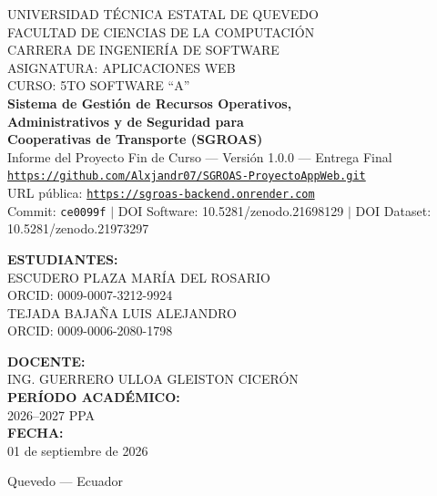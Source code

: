 \begin{titlepage}
\centering
\vspace*{0.6cm}

{\Large UNIVERSIDAD TÉCNICA ESTATAL DE QUEVEDO}\\[0.2cm]
{\Large FACULTAD DE CIENCIAS DE LA COMPUTACIÓN}\\[0.2cm]
{\Large CARRERA DE INGENIERÍA DE SOFTWARE}\\[0.4cm]
{\large ASIGNATURA: APLICACIONES WEB}\\[0.2cm]
{\large CURSO: 5TO SOFTWARE ``A''}\\[1.2cm]

{\LARGE \textbf{Sistema de Gestión de Recursos Operativos,}}\\[0.2cm]
{\LARGE \textbf{Administrativos y de Seguridad para}}\\[0.2cm]
{\LARGE \textbf{Cooperativas de Transporte (SGROAS)}}\\[0.6cm]
{\large Informe del Proyecto Fin de Curso --- Versión 1.0.0 --- Entrega Final}\\[0.4cm]
{\small \texttt{\href{https://github.com/Alxjandr07/SGROAS-ProyectoAppWeb.git}{https://github.com/Alxjandr07/SGROAS-ProyectoAppWeb.git}}}\\[0.2cm]
{\small URL pública: \texttt{\href{https://sgroas-backend.onrender.com}{https://sgroas-backend.onrender.com}}}\\[0.2cm]
{\small Commit: \texttt{ce0099f} $\vert$ DOI Software: 10.5281/zenodo.21698129 $\vert$ DOI Dataset: 10.5281/zenodo.21973297}\\[1.0cm]

\begin{minipage}{0.5\textwidth}
\centering
\textbf{ESTUDIANTES:}\\[0.4cm]
ESCUDERO PLAZA MARÍA DEL ROSARIO\\
\textsc{ORCID: 0009-0007-3212-9924}\\[0.3cm]
TEJADA BAJAÑA LUIS ALEJANDRO\\
\textsc{ORCID: 0009-0006-2080-1798}
\end{minipage}
\hfill
\begin{minipage}{0.4\textwidth}
\centering
\textbf{DOCENTE:}\\[0.4cm]
ING. GUERRERO ULLOA GLEISTON CICERÓN\\[0.8cm]
\textbf{PERÍODO ACADÉMICO:}\\
2026--2027 PPA\\[0.8cm]
\textbf{FECHA:}\\
01 de septiembre de 2026
\end{minipage}

\vfill

{\small Quevedo --- Ecuador}
\end{titlepage}
